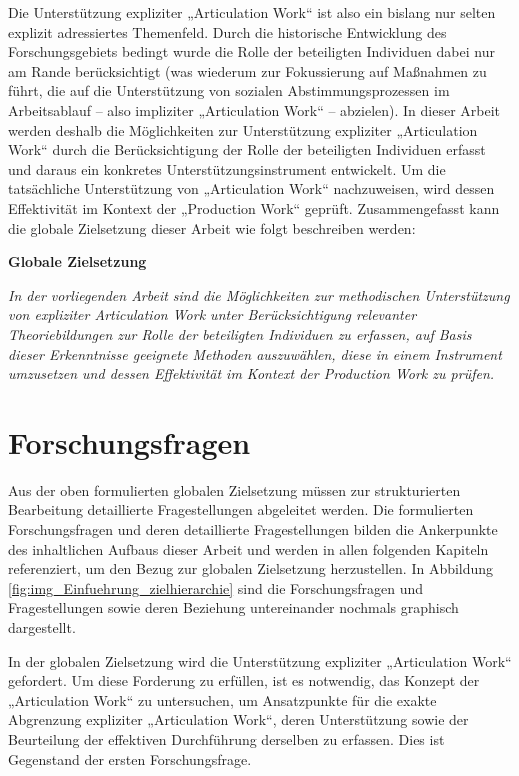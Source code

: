 Die Unterstützung expliziter „Articulation Work“ ist also ein bislang nur selten explizit adressiertes Themenfeld. Durch die historische Entwicklung des Forschungsgebiets bedingt wurde die Rolle der beteiligten Individuen dabei nur am Rande berücksichtigt (was wiederum zur Fokussierung auf Maßnahmen zu führt, die auf die Unterstützung von sozialen Abstimmungsprozessen im Arbeitsablauf -- also impliziter „Articulation Work“ -- abzielen). In dieser Arbeit werden deshalb die Möglichkeiten zur Unterstützung expliziter „Articulation Work“ durch die Berücksichtigung der Rolle der beteiligten Individuen erfasst und daraus ein konkretes Unterstützungsinstrument entwickelt. Um die tatsächliche Unterstützung von „Articulation Work“ nachzuweisen, wird dessen Effektivität im Kontext der „Production Work“ geprüft. Zusammengefasst kann die globale Zielsetzung dieser Arbeit wie folgt beschreiben werden:

\begin{framed}
	\label{zielsetzung}\textbf{Globale Zielsetzung} 
	
	\emph{In der vorliegenden Arbeit sind die Möglichkeiten zur methodischen Unterstützung von expliziter Articulation Work unter Berücksichtigung relevanter Theoriebildungen zur Rolle der beteiligten Individuen zu erfassen, auf Basis dieser Erkenntnisse geeignete Methoden auszuwählen, diese in einem Instrument umzusetzen und dessen Effektivität im Kontext der Production Work zu prüfen.}
\end{framed}


\section{Forschungsfragen} %
\label{sec:forschungsfragen}

Aus der oben formulierten globalen Zielsetzung müssen zur strukturierten Bearbeitung detaillierte Fragestellungen abgeleitet werden. Die formulierten Forschungsfragen und deren detaillierte Fragestellungen bilden die Ankerpunkte des inhaltlichen Aufbaus dieser Arbeit und werden in allen folgenden Kapiteln referenziert, um den Bezug zur globalen Zielsetzung herzustellen. In Abbildung \ref{fig:img_Einfuehrung_zielhierarchie} sind die Forschungsfragen und Fragestellungen sowie deren Beziehung untereinander nochmals graphisch dargestellt.

In der globalen Zielsetzung wird die Unterstützung expliziter „Articulation Work“ gefordert. Um diese Forderung zu erfüllen, ist es notwendig, das Konzept der „Articulation Work“ zu untersuchen, um Ansatzpunkte für die exakte Abgrenzung expliziter „Articulation Work“, deren Unterstützung sowie der Beurteilung der effektiven Durchführung derselben zu erfassen. Dies ist Gegenstand der ersten Forschungsfrage. 

